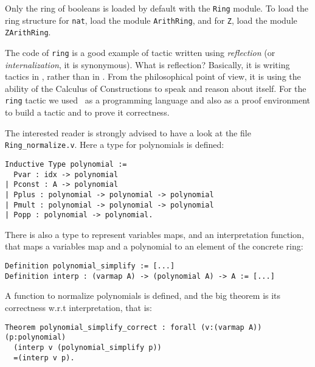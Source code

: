 \Warning Only the ring of booleans is loaded by default with the
\texttt{Ring} module. To load the ring structure for \texttt{nat},
load the module \texttt{ArithRing}, and for \texttt{Z},
load the module \texttt{ZArithRing}.



The code of \texttt{ring} is a good example of tactic written using
\textit{reflection} (or \textit{internalization}, it is synonymous).
What is reflection? Basically, it is writing \Coq{} tactics in \Coq,
rather than in \ocaml. From the philosophical point of view, it is
using the ability of the Calculus of Constructions to speak and reason
about itself.  For the \texttt{ring} tactic we used \Coq\ as a
programming language and also as a proof environment to build a tactic
and to prove it correctness.

The interested reader is strongly advised to have a look at the file
\texttt{Ring\_normalize.v}. Here a type for polynomials is defined: 

\begin{small}
\begin{flushleft}
\begin{verbatim}
Inductive Type polynomial := 
  Pvar : idx -> polynomial
| Pconst : A -> polynomial
| Pplus : polynomial -> polynomial -> polynomial
| Pmult : polynomial -> polynomial -> polynomial
| Popp : polynomial -> polynomial.
\end{verbatim}
\end{flushleft}
\end{small}

There is also a type to represent variables maps, and an
interpretation function, that maps a variables map and a polynomial to an
element of the concrete ring:

\begin{small}
\begin{flushleft}
\begin{verbatim}
Definition polynomial_simplify := [...]
Definition interp : (varmap A) -> (polynomial A) -> A := [...]
\end{verbatim}
\end{flushleft}
\end{small}

A function to normalize polynomials is defined, and the big theorem is
its correctness w.r.t interpretation, that is:

\begin{small}
\begin{flushleft}
\begin{verbatim}
Theorem polynomial_simplify_correct : forall (v:(varmap A))(p:polynomial)
  (interp v (polynomial_simplify p))
  =(interp v p).
\end{verbatim}
\end{flushleft}
\end{small}

